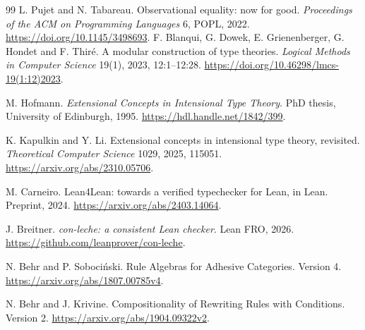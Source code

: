 \documentclass[11pt,a4paper]{article}
\theoremstyle{plain}
\theoremstyle{definition}
\theoremstyle{remark}
\begin{document}
\begin{thebibliography}{99}
L. Pujet and N. Tabareau. Observational equality: now for good.
\emph{Proceedings of the ACM on Programming Languages} 6, POPL, 2022.
\url{https://doi.org/10.1145/3498693}.
F. Blanqui, G. Dowek, E. Grienenberger, G. Hondet and F. Thir\'e.
A modular construction of type theories.
\emph{Logical Methods in Computer Science} 19(1), 2023, 12:1--12:28.
\url{https://doi.org/10.46298/lmcs-19(1:12)2023}.

M. Hofmann. \emph{Extensional Concepts in Intensional Type Theory}.
PhD thesis, University of Edinburgh, 1995.
\url{https://hdl.handle.net/1842/399}.

K. Kapulkin and Y. Li. Extensional concepts in intensional type theory,
revisited. \emph{Theoretical Computer Science} 1029, 2025, 115051.
\url{https://arxiv.org/abs/2310.05706}.

M. Carneiro. Lean4Lean: towards a verified typechecker for Lean, in Lean.
Preprint, 2024. \url{https://arxiv.org/abs/2403.14064}.

J. Breitner. \emph{con-leche: a consistent Lean checker}.
Lean FRO, 2026. \url{https://github.com/leanprover/con-leche}.

N. Behr and P. Soboci\'nski. Rule Algebras for Adhesive Categories.
Version 4. \url{https://arxiv.org/abs/1807.00785v4}.

N. Behr and J. Krivine. Compositionality of Rewriting Rules with Conditions.
Version 2. \url{https://arxiv.org/abs/1904.09322v2}.

\end{thebibliography}
\end{document}

